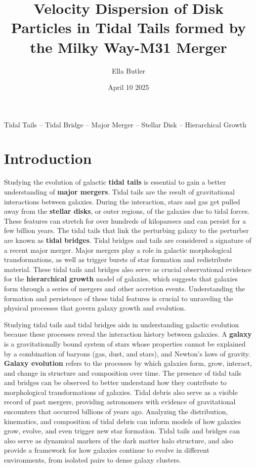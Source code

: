\documentclass[fleqn,usenatbib]{mnras}
\title{Velocity Dispersion of Disk Particles in Tidal Tails formed by the Milky Way-M31 Merger}
\author[]{Ella Butler}
\date{April 10 2025}
\begin{document}
\label{firstpage}
\pagerange{\pageref{firstpage}--\pageref{lastpage}}
\maketitle
\begin{keywords}
Tidal Tails -- Tidal Bridge -- Major Merger -- Stellar Disk -- Hierarchical Growth
\end{keywords}



\section{Introduction}

Studying the evolution of galactic \textbf{tidal tails} is essential to gain a better understanding of \textbf{major mergers}. Tidal tails are the result of gravitational interactions between galaxies. During the interaction, stars and gas get pulled away from the \textbf{stellar disks}, or outer regions, of the galaxies due to tidal forces. These features can stretch for over hundreds of kiloparsecs and can persist for a few billion years. The tidal tails that link the perturbing galaxy to the perturber are known as \textbf{tidal bridges}. Tidal bridges and tails are considered a signature of a recent major merger. Major mergers play a role in galactic morphological transformations, as well as trigger bursts of star formation and redistribute material. These tidal tails and bridges also serve as crucial observational evidence for the \textbf{hierarchical growth} model of galaxies, which suggests that galaxies form through a series of mergers and other accretion events. Understanding the formation and persistence of these tidal features is crucial to unraveling the physical processes that govern galaxy growth and evolution. 

Studying tidal tails and tidal bridges aids in understanding galactic evolution because these processes reveal the interaction history between galaxies. A \textbf{galaxy} is a gravitationally bound system of stars whose properties cannot be explained by a combination of baryons (gas, dust, and stars), and Newton's laws of gravity. \textbf{Galaxy evolution} refers to the processes by which galaxies form, grow, interact, and change in structure and composition over time. The presence of tidal tails and bridges can be observed to better understand how they contribute to morphological transformations of galaxies. Tidal debris also serve as a visible record of past mergers, providing astronomers with evidence of gravitational encounters that occurred billions of years ago. Analyzing the distribution, kinematics, and composition of tidal debris can inform models of how galaxies grow, evolve, and even trigger new star formation. Tidal tails and bridges can also serve as dynamical markers of the dark matter halo structure, and also provide a framework for how galaxies continue to evolve in different environments, from isolated pairs to dense galaxy clusters.
\end{document}
